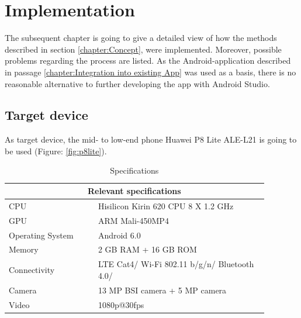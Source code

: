 

\chapter{Implementation}\label{chapter:Implementation}
The subsequent chapter is going to give a detailed view of how the methods described in section \ref{chapter:Concept}, were implemented. Moreover, possible problems regarding the process are listed. 
As the Android-application described in passage \ref{chapter:Integration into existing App} was used as a basis, there is no reasonable alternative to further developing the app with Android Studio.

\section{Target device}
As target device, the mid- to low-end phone Huawei P8 Lite ALE-L21 is going to be used (Figure: \ref{fig:p8lite}).
\begin{table}[h]
	\begin{tabular}{|p{0.3\linewidth} || p{0.58\linewidth}|}
		\hline
		\multicolumn{2}{|c|}{Relevant specifications} \\
		\hline\hline
		CPU & Hisilicon Kirin 620 CPU 8 X 1.2 GHz \\
		\hline
		GPU & ARM Mali-450MP4 \\
		\hline
		Operating System & Android 6.0  \\
		\hline
		Memory & 2 GB RAM + 16 GB ROM \\
		\hline
		Connectivity & LTE Cat4/ Wi-Fi 802.11 b/g/n/ Bluetooth 4.0/ \\
		\hline
		Camera & 13 MP BSI camera + 5 MP camera\\
		\hline
		Video & 1080p@30fps \\
		\hline
	\end{tabular}
	\caption{Specifications}
	\label{table:specifications}
\end{table}
